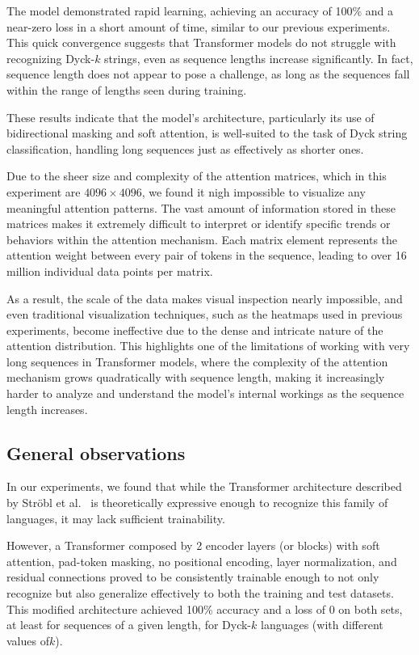 The model demonstrated rapid learning, achieving an accuracy of 100\% and a near-zero loss in a short amount of time, similar to our previous experiments. This quick convergence suggests that Transformer models do not struggle with recognizing Dyck-$k$ strings, even as sequence lengths increase significantly. In fact, sequence length does not appear to pose a challenge, as long as the sequences fall within the range of lengths seen during training.

These results indicate that the model's architecture, particularly its use of bidirectional masking and soft attention, is well-suited to the task of Dyck string classification, handling long sequences just as effectively as shorter ones.

Due to the sheer size and complexity of the attention matrices, which in this experiment are $4096 \times 4096$, we found it nigh impossible to visualize any meaningful attention patterns. The vast amount of information stored in these matrices makes it extremely difficult to interpret or identify specific trends or behaviors within the attention mechanism. Each matrix element represents the attention weight between every pair of tokens in the sequence, leading to over 16 million individual data points per matrix.

As a result, the scale of the data makes visual inspection nearly impossible, and even traditional visualization techniques, such as the heatmaps used in previous experiments, become ineffective due to the dense and intricate nature of the attention distribution. This highlights one of the limitations of working with very long sequences in Transformer models, where the complexity of the attention mechanism grows quadratically with sequence length, making it increasingly harder to analyze and understand the model’s internal workings as the sequence length increases.

\subsection{General observations}

In our experiments, we found that while the Transformer architecture described by Ströbl et al.~\cite{strobl2024formal} is theoretically expressive enough to recognize this family of languages, it may lack sufficient trainability. 

However, a Transformer composed by 2 encoder layers (or blocks) with soft attention, pad-token masking, no positional encoding, layer normalization, and residual connections proved to be consistently trainable enough to not only recognize but also generalize effectively to both the training and test datasets. This modified architecture achieved 100\% accuracy and a loss of 0 on both sets, at least for sequences of a given length, for Dyck-$k$ languages (with different values of$k$). 

